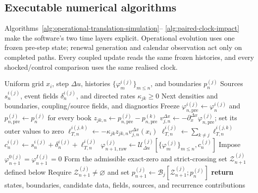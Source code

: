 
\subsection{Executable numerical algorithms}
\label{app:numerical-algorithms}

Algorithms~\ref{alg:operational-translation-simulation}--
\ref{alg:paired-clock-impact} make the software's two time layers explicit.
Operational evolution uses one frozen pre-step state; renewal generation and
calendar observation act only on completed paths.  Every coupled update reads
the same frozen histories, and every shocked/control comparison uses the same
realised clock.

\begin{algorithm}[H]
\caption{Coupled operational-time reaction-boundary evolution}
\label{alg:operational-translation-simulation}
\begin{algorithmic}[1]
\Require Uniform grid $x_i$, step $\Delta u$, histories
$\{\varphi_m^{i(j)}\}_{m\leq n}$, and boundaries $p_n^{(j)}$
\Require Sources $s_n^{i(j)}$, event fields $\delta_n^{i(j)}$, and directed
rates $\kappa_{jk}\geq0$
\Ensure Next densities and boundaries, coupling/source fields, and diagnostics
\State Freeze $\varphi_{n,\mathrm{pre}}^{i(j)}\gets\varphi_n^{i(j)}$ and
$p_{n,\mathrm{pre}}^{(j)}\gets p_n^{(j)}$ for every book
  \State $z_{jk,n}\gets p_{n,\mathrm{pre}}^{(j)}-p_{n,\mathrm{pre}}^{(k)}$
  \State $v_{j,n}^{\Delta x}\gets-\partial_x^{\Delta x}
  \varphi_{n,\mathrm{pre}}^{(j)}$; set its outer values to zero
  \State $\ell_{T,n}^{i(j,k)}\gets-\kappa_{jk}z_{jk,n}
  v_{j,n}^{\Delta x}(x_i)$
\EndFor
{}
  \State $\ell_{T,n}^{i(j)}\gets\sum_{k\ne j}\ell_{T,n}^{i(j,k)}$
  \State $c_n^{i(j)}\gets s_n^{i(j)}+\delta_n^{i(j)}+
  \ell_{T,n}^{i(j)}$
  \State $\varphi_{n+1,\mathrm{raw}}^{(j)}\gets
  \mathcal U_{\Delta u}^{(j)}[\{\varphi_m^{(j)}\}_{m\leq n},c_n^{(j)}]$
  \State Impose $\varphi_{n+1}^{0(j)}=\varphi_{n+1}^{I(j)}=0$
  \State Form the admissible exact-zero and strict-crossing set
  $\mathcal Z_{n+1}^{(j)}$ defined below
  \State Require $\mathcal Z_{n+1}^{(j)}\ne\varnothing$ and set
  $p_{n+1}^{(j)}\gets\mathcal B_j[\mathcal Z_{n+1}^{(j)};p_n^{(j)}]$
\EndFor
\State \textbf{return} states, boundaries, candidate data, fields, sources,
and recurrence contributions
\end{algorithmic}
\end{algorithm}

